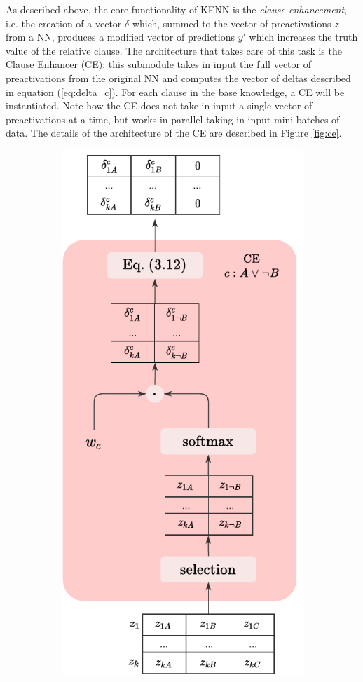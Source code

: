 As described above, the core functionality of KENN is the \textit{clause enhancement}, i.e. the creation of a vector $\delta$ which, summed to the vector of preactivations $z$ from a NN, produces a modified vector of predictions $y'$ which increases the truth value of the relative clause.
 The architecture that takes care of this task is the Clause Enhancer (CE): this submodule takes in input the full vector of preactivations from the original NN and computes the vector of deltas described in equation (\ref{eq:delta_c}). For each clause in the base knowledge, a CE will be instantiated. Note how the CE does not take in input a single vector of preactivations at a time, but works in parallel taking in input mini-batches of data. The details of the architecture of the CE are described in Figure \ref{fig:ce}.
\begin{figure}
	\centering
	\begin{subfigure}{.5\textwidth}
		\centering
		\includegraphics[width=0.8\linewidth]{figures/CE.pdf}

\end{subfigure}
\end{figure}
